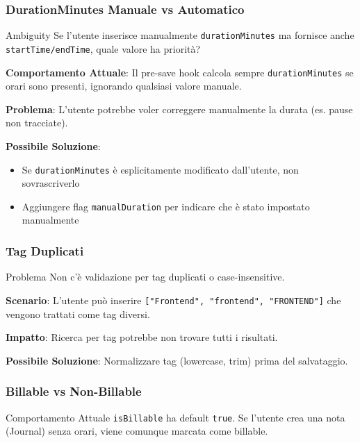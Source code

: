 \documentclass[11pt,a4paper]{article}
\begin{document}
\subsubsection{DurationMinutes Manuale vs Automatico}

\begin{warningbox}{Ambiguity}
Se l'utente inserisce manualmente \texttt{durationMinutes} ma fornisce anche \texttt{startTime/endTime}, quale valore ha priorità?
\end{warningbox}

\textbf{Comportamento Attuale}: Il pre-save hook calcola sempre \texttt{durationMinutes} se orari sono presenti, ignorando qualsiasi valore manuale.

\textbf{Problema}: L'utente potrebbe voler correggere manualmente la durata (es. pause non tracciate).

\textbf{Possibile Soluzione}: 
\begin{itemize}
    \item Se \texttt{durationMinutes} è esplicitamente modificato dall'utente, non sovrascriverlo
    \item Aggiungere flag \texttt{manualDuration} per indicare che è stato impostato manualmente
\end{itemize}

\subsubsection{Tag Duplicati}

\begin{warningbox}{Problema}
Non c'è validazione per tag duplicati o case-insensitive.
\end{warningbox}

\textbf{Scenario}: L'utente può inserire \texttt{["Frontend", "frontend", "FRONTEND"]} che vengono trattati come tag diversi.

\textbf{Impatto}: Ricerca per tag potrebbe non trovare tutti i risultati.

\textbf{Possibile Soluzione}: Normalizzare tag (lowercase, trim) prima del salvataggio.

\subsubsection{Billable vs Non-Billable}

\begin{tipbox}{Comportamento Attuale}
\texttt{isBillable} ha default \texttt{true}. Se l'utente crea una nota (Journal) senza orari, viene comunque marcata come billable.
\end{tipbox}
\end{document}
